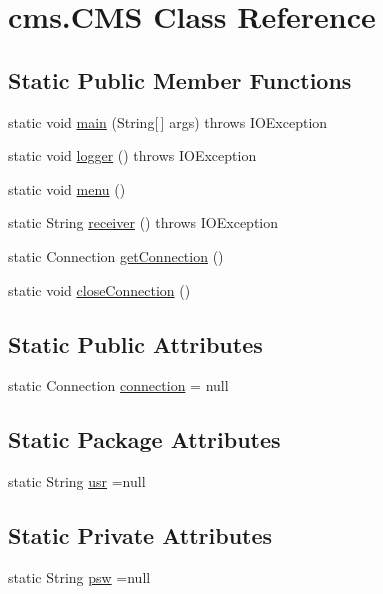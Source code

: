 \hypertarget{classcms_1_1_c_m_s}{}\section{cms.\+C\+MS Class Reference}
\label{classcms_1_1_c_m_s}
\subsection*{Static Public Member Functions}
\begin{DoxyCompactItemize}
\item 
static void \mbox{\hyperlink{classcms_1_1_c_m_s_a5c480aa2373ca60f78bcdf467c09d1d9}{main}} (String\mbox{[}$\,$\mbox{]} args)  throws I\+O\+Exception 
\item 
static void \mbox{\hyperlink{classcms_1_1_c_m_s_a8c344bccd734ba0a3dbadb99d2fcbed1}{logger}} ()  throws I\+O\+Exception
\item 
static void \mbox{\hyperlink{classcms_1_1_c_m_s_a3256378f3b9ccd38f1db10ee80daf9f3}{menu}} ()
\item 
static String \mbox{\hyperlink{classcms_1_1_c_m_s_ad13be0e97a0bb295dcedd134942a79b4}{receiver}} ()  throws I\+O\+Exception
\item 
static Connection \mbox{\hyperlink{classcms_1_1_c_m_s_ae70f453d4704bfb9d89ddc637c52dc30}{get\+Connection}} ()
\item 
static void \mbox{\hyperlink{classcms_1_1_c_m_s_a8f49d9319782a9aa839dd78bb30315cf}{close\+Connection}} ()
\end{DoxyCompactItemize}
\subsection*{Static Public Attributes}
\begin{DoxyCompactItemize}
\item 
static Connection \mbox{\hyperlink{classcms_1_1_c_m_s_afc28cfd2c4356509b85775219b7b1e05}{connection}} = null
\end{DoxyCompactItemize}
\subsection*{Static Package Attributes}
\begin{DoxyCompactItemize}
\item 
static String \mbox{\hyperlink{classcms_1_1_c_m_s_acce8f8027f3a43eabae951ddf2a9c5d9}{usr}} =null
\end{DoxyCompactItemize}
\subsection*{Static Private Attributes}
\begin{DoxyCompactItemize}
\item 
static String \mbox{\hyperlink{classcms_1_1_c_m_s_a84681758bb3035a56a9bf541f47a6964}{psw}} =null
\end{DoxyCompactItemize}


